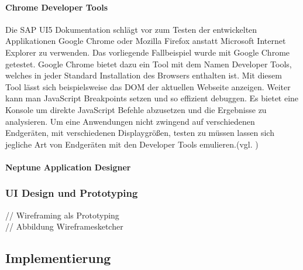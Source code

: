 \documentclass[12pt,a4paper,bibliography=totocnumbered,listof=totocnumbered]{scrartcl}
\begin{document}
\paragraph{Chrome Developer Tools}
Die SAP UI5 Dokumentation schlägt vor zum Testen der entwickelten Applikationen Google Chrome oder Mozilla Firefox anstatt Microsoft Internet Explorer zu verwenden. Das vorliegende Fallbeispiel wurde mit Google Chrome getestet. Google Chrome bietet dazu ein Tool mit dem Namen Developer Tools, welches in jeder Standard Installation des Browsers enthalten ist. Mit diesem Tool lässt sich beispielsweise das DOM der aktuellen Webseite anzeigen. Weiter kann man JavaScript Breakpoints setzen und so effizient debuggen. Es bietet eine Konsole um direkte JavaScript Befehle abzusetzen und die Ergebnisse zu analysieren. Um eine Anwendungen nicht zwingend auf verschiedenen Endgeräten, mit verschiedenen Displaygrößen, testen zu müssen lassen sich jegliche Art von Endgeräten mit den Developer Tools emulieren.(vgl. \cite{DevTools})

\paragraph{Neptune Application Designer}


\subsubsection{UI Design und Prototyping}
// Wireframing als Prototyping\\
// Abbildung Wireframesketcher\\

\subsection{Implementierung}
\end{document}
